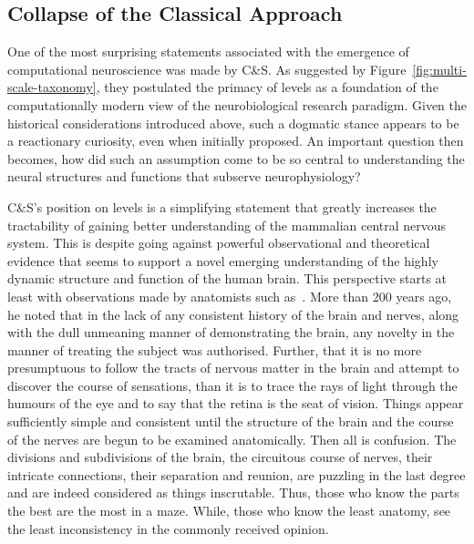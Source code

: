 \documentclass[11pt,3p,twocolumn]{JMN}
\begin{document}
\subsection{Collapse of the Classical Approach}

One of the most surprising statements associated with the emergence of computational neuroscience was made by C\&S. As suggested by Figure~\ref{fig:multi-scale-taxonomy}, they postulated the primacy of levels as a foundation of the computationally modern view of the neurobiological research paradigm. Given the historical considerations introduced above, such a dogmatic stance appears to be a reactionary curiosity, even when initially proposed. An important question then becomes, how did such an assumption come to be so central to understanding the neural structures and functions that subserve neurophysiology?

C\&S's position on levels is a simplifying statement that greatly increases the tractability of gaining better understanding of the mammalian central nervous system. This is despite going against powerful observational and theoretical evidence that seems to support a novel emerging understanding of the highly dynamic structure and function of the human brain. This perspective starts at least with observations made by anatomists such as~\citet{bell11}. More than 200 years ago, he noted that in the lack of any consistent history of the brain and nerves, along with the dull unmeaning manner of demonstrating the brain, any novelty in the manner of treating the subject was authorised. Further, that it is no more presumptuous to follow the tracts of nervous matter in the brain and attempt to discover the course of sensations, than it is to trace the rays of light through the humours of the eye and to say that the retina is the seat of vision. Things appear sufficiently simple and consistent until the structure of the brain and the course of the nerves are begun to be examined anatomically. Then all is confusion. The divisions and subdivisions of the brain, the circuitous course of nerves, their intricate connections, their separation and reunion, are puzzling in the last degree and are indeed considered as things inscrutable. Thus, those who know the parts the best are the most in a maze. While, those who know the least anatomy, see the least inconsistency in the commonly received opinion.
\end{document}
